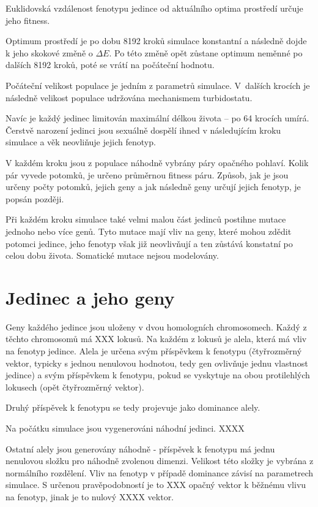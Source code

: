 Euklidovská vzdálenost fenotypu jedince od aktuálního optima prostředí určuje jeho fitness.

Optimum prostředí je po dobu 8192 kroků simulace konstantní a následně dojde k jeho skokové změně o
$\Delta{}E$. Po této změně opět zůstane optimum neměnné po dalších 8192 kroků, poté se vrátí na počáteční hodnotu.

Počáteční velikost populace je jedním z parametrů simulace. V~dalších krocích je následně velikost populace udržována
mechanismem turbidostatu.

Navíc je každý jedinec limitován maximální délkou života -- po 64 krocích umírá.
Čerstvě narození jedinci jsou sexuálně dospělí ihned v následujícím kroku simulace a věk neovliňuje jejich fenotyp.

V každém kroku jsou z populace náhodně vybrány páry opačného pohlaví.
Kolik pár vyvede potomků, je určeno průměrnou fitness páru. Způsob, jak je jsou určeny počty potomků, jejich geny a
jak následně geny určují jejich fenotyp, je popsán později.

Při každém kroku simulace také velmi malou část jedinců postihne mutace jednoho nebo více genů. Tyto mutace mají
vliv na geny, které mohou zdědit potomci jedince, jeho fenotyp však již neovlivňují a ten zůstává konstatní po celou
dobu života. Somatické mutace nejsou modelovány.

\section{Jedinec a jeho geny}

Geny každého jedince jsou uloženy v dvou homologních chromosomech. Každý z těchto chromosomů má XXX lokusů.
Na každém z lokusů je alela, která má vliv na fenotyp jedince. Alela je určena svým příspěvkem k fenotypu (čtyřrozměrný
vektor, typicky s jednou nenulovou hodnotou, tedy gen ovlivňuje jednu vlastnost jedince) a svým příspěvkem k fenotypu,
pokud se vyskytuje na obou protilehlých lokusech (opět čtyřrozměrný vektor).

Druhý příspěvek k fenotypu se tedy projevuje jako dominance alely.

Na počátku simulace jsou vygenerováni náhodní jedinci. XXXX

Ostatní alely jsou generovány náhodně - příspěvek k fenotypu
má jednu nenulovou složku pro náhodně zvolenou dimenzi. Velikost této složky je vybrána z normálního rozdělení. Vliv na
fenotyp v případě dominance závisí na parametrech simulace. S určenou pravěpodobností je to XXX opačný vektor k běžnému
vlivu na fenotyp, jinak je to nulový XXXX vektor.

